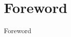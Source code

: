 
\begingroup
\let\clearpage\relax
\let\cleardoublepage\relax
\let\cleardoublepage\relax
\chapter*{Foreword}
Foreword



\endgroup

